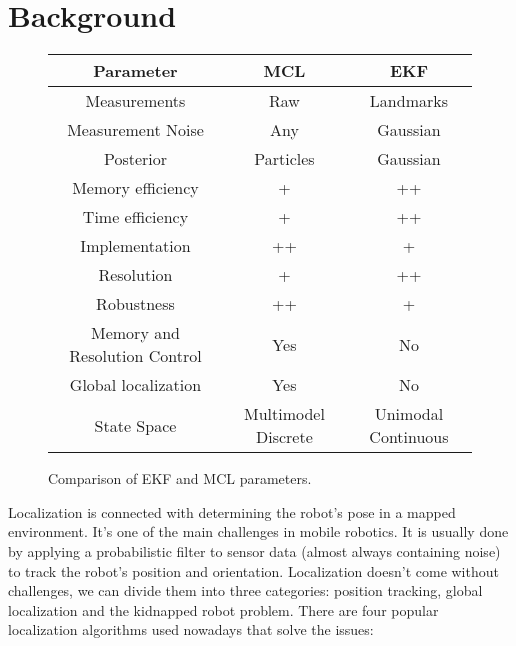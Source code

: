 \documentclass[10pt,journal,compsoc]{IEEEtran}
\begin{document}
    \section{Background}

    \begin{figure*}
        \label{fig:ekfvsmcl}            
        \begin{center}
            \caption{Comparison of EKF and MCL parameters.}
            \begin{tabular}{|c|c|c|}     
                \hline           
                \textbf{Parameter} & \textbf{MCL} & \textbf{EKF} \\                
                \hline
                Measurements & Raw & Landmarks \\
                \hline
                Measurement Noise & Any & Gaussian \\
                \hline
                Posterior & Particles & Gaussian \\
                \hline
                Memory efficiency & + & ++ \\
                \hline
                Time efficiency & + & ++ \\
                \hline
                Implementation & ++ & + \\
                \hline
                Resolution & +  & ++ \\
                \hline
                Robustness & ++ & + \\
                \hline
                Memory and Resolution Control & Yes & No \\
                \hline
                Global localization & Yes & No \\
                \hline
                State Space & Multimodel Discrete & Unimodal Continuous \\
                \hline
            \end{tabular}
        \end{center}
    \end{figure*}

    Localization is connected with determining the robot's pose in a mapped environment. It's one of the main challenges in mobile robotics. It is usually done by applying a probabilistic filter to sensor data (almost always containing noise) to track the robot's position and orientation. Localization doesn't come without challenges, we can divide them into three categories: position tracking, global localization and the kidnapped robot problem. There are four popular localization algorithms used nowadays that solve the issues:
\end{document}
